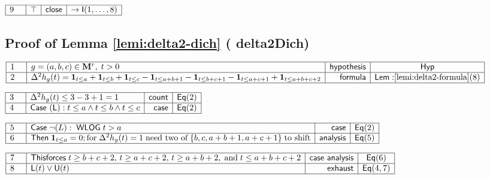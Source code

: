 \documentclass[11pt,reqno]{amsart}
\begin{document}
\nointerlineskip\noindent$%
\begin{array}{|m{0.5cm}|l|r|c|}
\hline
9 & \top & \mathsf{close} & \to\mathsf{I}(1,\dots,8) \\ \hline
\end{array}%
$

\medskip


\subsection*{Proof of Lemma \protect\ref{lemi:delta2-dich} (\textsf{%
delta2Dich})}

\noindent$%
\begin{array}{|m{0.5cm}|l|r|c|}
\hline
1 & g=(a,b,c)\in\mathbf{M}^{r},\;t>0 & \mathsf{hypothesis} & \mathsf{Hyp} \\ 
\hline
2 & \Delta^{2}h_{g}(t)=\mathbf{1}_{t\le a}+\mathbf{1}_{t\le b}+\mathbf{1}%
_{t\le c}-\mathbf{1}_{t\le a+b+1}-\mathbf{1}_{t\le b+c+1}-\mathbf{1}_{t\le
a+c+1}+\mathbf{1}_{t\le a+b+c+2} & \mathsf{formula} & \mathsf{Lem:}\ref%
{lemi:delta2-formula}(8) \\ \hline
\end{array}%
$

\nointerlineskip\noindent$%
\begin{array}{|m{0.5cm}|l|r|c|}
\hline
3 & \Delta^{2}h_{g}(t)\le3-3+1=1 & \mathsf{count} & \mathsf{Eq}(2) \\ \hline
4 & \mathsf{Case\ (L):}\;t\le a\wedge t\le b\wedge t\le c & \mathsf{case} & 
\mathsf{Eq}(2) \\ \hline
\end{array}%
$

\nointerlineskip\noindent$%
\begin{array}{|m{0.5cm}|l|r|c|}
\hline
5 & \mathsf{Case}\;\neg(L):\;\mathsf{WLOG}\;t>a & \mathsf{case} & \mathsf{Eq}%
(2) \\ \hline
6 & \mathsf{Then}\;\mathbf{1}_{t\le a}=0;\text{for}\;\Delta^{2}h_{g}(t)=1\;%
\text{need two of}\;\{b,c,a+b+1,a+c+1\}\;\text{to shift} & \mathsf{analysis}
& \mathsf{Eq}(5) \\ \hline
\end{array}%
$

\nointerlineskip\noindent$%
\begin{array}{|m{0.5cm}|l|r|c|}
\hline
7 & \mathsf{This forces}\;t\ge b+c+2,\,t\ge a+c+2,\,t\ge a+b+2,\;\text{and}%
\;t\le a+b+c+2 & \mathsf{case\ analysis} & \mathsf{Eq}(6) \\ \hline
8 & \mathsf{L}(t)\vee\mathsf{U}(t) & \mathsf{exhaust} & \mathsf{Eq}(4,7) \\ 
\hline
\end{array}%
$
\end{document}
